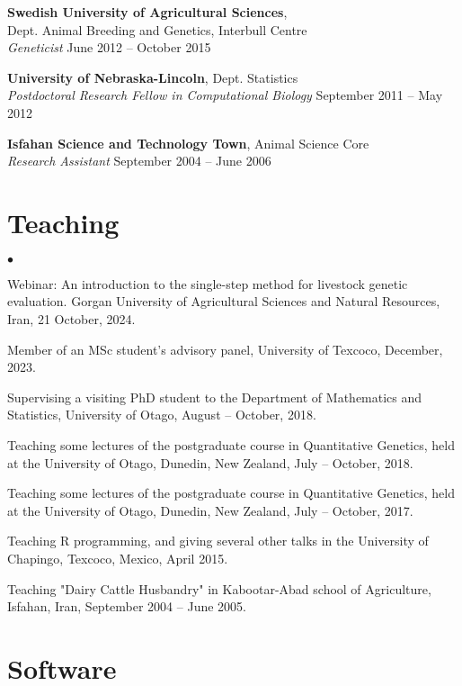 \documentclass[margin,line]{res}
\newenvironment{list2}{
  \begin{list}{$\bullet$}{%
      \setlength{\itemsep}{0in}
      \setlength{\parsep}{0in} \setlength{\parskip}{0in}
      \setlength{\topsep}{0in} \setlength{\partopsep}{0in}
      \setlength{\leftmargin}{0.2in}}}{\end{list}}
\begin{document}
\begin{resume}
  {\bf Swedish University of Agricultural Sciences}, \\
  Dept. Animal Breeding and Genetics, Interbull Centre \\
  {\em Geneticist} \hfill{June 2012 -- October 2015}

  {\bf University of Nebraska-Lincoln}, Dept. Statistics \\
  {\em Postdoctoral Research Fellow in Computational Biology} \hfill{September 2011 -- May 2012}

  {\bf Isfahan Science and Technology Town}, Animal Science Core \\
  {\em Research Assistant} \hfill{September 2004 -- June 2006}
  \section{\sc Teaching}

  \begin{list2}
    \item Webinar: An introduction to the single-step method for livestock genetic evaluation. Gorgan University of Agricultural Sciences and Natural Resources, Iran, 21 October, 2024.
    \item Member of an MSc student's advisory panel, University of Texcoco, December, 2023.
    \item Supervising a visiting PhD student to the Department of Mathematics and Statistics, University of Otago, August -- October, 2018.
    \item Teaching some lectures of the postgraduate course in Quantitative Genetics, held at the University of Otago, Dunedin, New Zealand, July -- October, 2018.
    \item Teaching some lectures of the postgraduate course in Quantitative Genetics, held at the University of Otago, Dunedin, New Zealand, July -- October, 2017.
    \item Teaching R programming, and giving several other talks in the University of Chapingo, Texcoco, Mexico, April 2015.
    \item Teaching "Dairy Cattle Husbandry" in Kabootar-Abad school of Agriculture, Isfahan, Iran, September 2004 -- June 2005.
  \end{list2}
  \section{\sc Software}


\end{resume}
\end{document}
